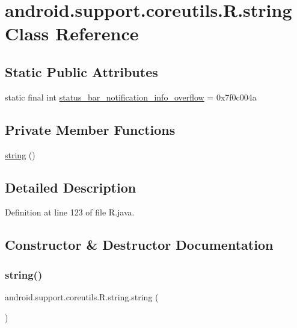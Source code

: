 \hypertarget{classandroid_1_1support_1_1coreutils_1_1_r_1_1string}{}\section{android.\+support.\+coreutils.\+R.\+string Class Reference}
\label{classandroid_1_1support_1_1coreutils_1_1_r_1_1string}
\subsection*{Static Public Attributes}
\begin{DoxyCompactItemize}
\item 
static final int \mbox{\hyperlink{classandroid_1_1support_1_1coreutils_1_1_r_1_1string_ac3802014c312560d8974b22579aba880}{status\+\_\+bar\+\_\+notification\+\_\+info\+\_\+overflow}} = 0x7f0c004a
\end{DoxyCompactItemize}
\subsection*{Private Member Functions}
\begin{DoxyCompactItemize}
\item 
\mbox{\hyperlink{classandroid_1_1support_1_1coreutils_1_1_r_1_1string_ad99745d1a77f2f9f13ed8c9dfed636c5}{string}} ()
\end{DoxyCompactItemize}


\subsection{Detailed Description}


Definition at line 123 of file R.\+java.



\subsection{Constructor \& Destructor Documentation}
\mbox{\label{classandroid_1_1support_1_1coreutils_1_1_r_1_1string_ad99745d1a77f2f9f13ed8c9dfed636c5}} 
\subsubsection{\texorpdfstring{string()}{string()}}
{\footnotesize\ttfamily android.\+support.\+coreutils.\+R.\+string.\+string (\begin{DoxyParamCaption}{ }\end{DoxyParamCaption})\hspace{0.3cm}{\ttfamily [private]}}



